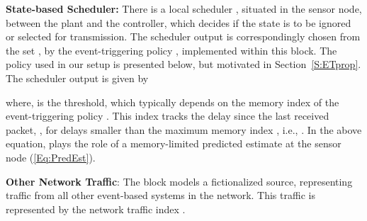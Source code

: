 \documentclass[journal]{IEEEtran}
\begin{document}
\noindent \textbf{State-based Scheduler: } There is a local scheduler , situated in the sensor node, between the plant and the controller, which decides if the state  is to be ignored or selected for transmission. The scheduler output  is correspondingly chosen from the set , by the event-triggering policy , implemented within this block. The policy used in our setup is presented below, but motivated in Section~\ref{S:ETprop}. The scheduler output is given by

where,  is the threshold, which typically depends on the memory index of the event-triggering policy . This index tracks the delay since the last received packet, , for delays smaller than the maximum memory index , i.e., . In the above equation,  plays the role of a memory-limited predicted estimate at the sensor node (\ref{Eq:PredEst}).

\noindent \textbf{Other Network Traffic}: The block  models a fictionalized source, representing traffic from all other event-based systems in the network. This traffic is represented by the network traffic index .
\end{document}
